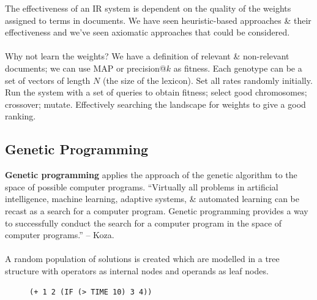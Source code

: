 \documentclass[a4paper,11pt]{article}
\begin{document}
\begin{tcolorbox}[colback=gray!10, colframe=black, title=\textbf{Case Study 1: Application of Genetic Algorithms to IR}]
    The effectiveness of an IR system is dependent on the quality of the weights assigned to terms in documents.
    We have seen heuristic-based approaches \& their effectiveness and we've seen axiomatic approaches that could be considered.
    \\\\
    Why not learn the weights?
    We have a definition of relevant \& non-relevant documents; we can use MAP or precision@$k$ as fitness.
    Each genotype can be a set of vectors of length $N$ (the size of the lexicon).
    Set all rates randomly initially.
    Run the system with a set of queries to obtain fitness; select good chromosomes; crossover; mutate.
    Effectively searching the landscape for weights to give a good ranking.
\end{tcolorbox}


\subsection{Genetic Programming}
\textbf{Genetic programming} applies the approach of the genetic algorithm to the space of possible computer programs.
``Virtually all problems in artificial intelligence, machine learning, adaptive systems, \& automated learning can be recast as a search for a computer program.
Genetic programming provides a way to successfully conduct the search for a computer program in the space of computer programs.'' -- Koza.
\\\\
A random population of solutions is created which are modelled in a tree structure with operators as internal nodes and operands as leaf nodes.


\begin{figure}[H]
    \centering
    \usetikzlibrary{trees}
    \caption{\texttt{(+ 1 2 (IF (> TIME 10) 3 4))}}
\end{figure}
\end{document}
